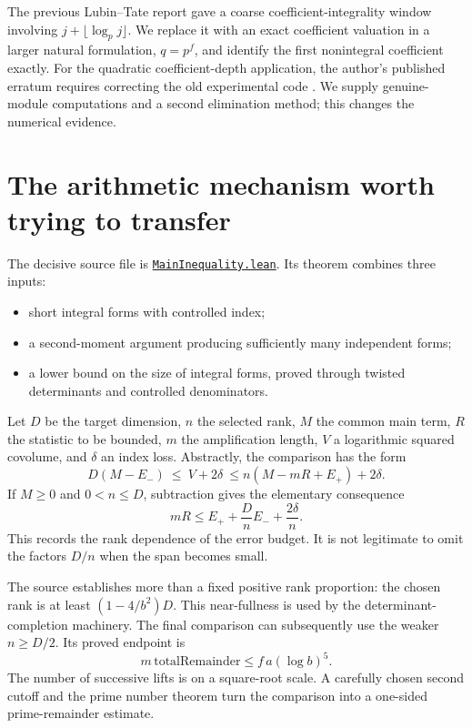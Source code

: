 \documentclass[11pt,letterpaper]{article}
\theoremstyle{definition}\newtheorem{definition}[theorem]{Definition}
\newcommand{\src}[2]{\href{https://github.com/lsernau/grh-lean/blob/72fead102f663d5c7a407964a13dc0cf9d977207/grh/src/#1}{#2}}
\newcommand{\code}[1]{{\small\texttt{\detokenize{#1}}}}
\begin{document}
The previous Lubin--Tate report gave a coarse coefficient-integrality window
involving \(j+\lfloor\log_p j\rfloor\). We replace it with an exact coefficient
valuation in a larger natural formulation, \(q=p^f\), and identify the first
nonintegral coefficient exactly. For the quadratic coefficient-depth
application, the author's published erratum requires correcting the old
experimental code \cite{BergerErrata}. We supply genuine-module computations
and a second elimination method; this changes the numerical evidence.

\section{The arithmetic mechanism worth trying to transfer}
\label{sec:arithmetic}

The decisive source file is
\src{New/Reduction/MainInequality.lean}{\texttt{MainInequality.lean}}.
Its theorem \code{New.star_inequality} combines three inputs:

\begin{itemize}
\item short integral forms with controlled index;
\item a second-moment argument producing sufficiently many independent forms;
\item a lower bound on the size of integral forms, proved through twisted
determinants and controlled denominators.
\end{itemize}

Let \(D\) be the target dimension, \(n\) the selected rank, \(M\) the common
main term, \(R\) the statistic to be bounded, \(m\) the amplification length,
\(V\) a logarithmic squared covolume, and \(\delta\) an index loss. Abstractly,
the comparison has the form
\begin{equation}
D(M-E_-)\ \le\ V+2\delta\
\le n(M-mR+E_+)+2\delta .
\label{eq:covolume}
\end{equation}
If \(M\ge0\) and \(0<n\le D\), subtraction gives the elementary consequence
\begin{equation}
mR\le E_++\frac{D}{n}E_-+\frac{2\delta}{n}.
\label{eq:budget}
\end{equation}
This records the rank dependence of the error budget. It is not legitimate
to omit the factors \(D/n\) when the span becomes small.

The source establishes more than a fixed positive rank proportion:
the chosen rank is at least \((1-4/b^2)D\). This near-fullness is used by the
determinant-completion machinery. The final comparison can subsequently use
the weaker \(n\ge D/2\). Its proved endpoint is
\[
m\,\mathrm{totalRemainder}\le f\,a(\log b)^5.
\]
The number of successive lifts is on a square-root scale. A carefully
chosen second cutoff and the prime number theorem turn the comparison into
a one-sided prime-remainder estimate.
\end{document}
